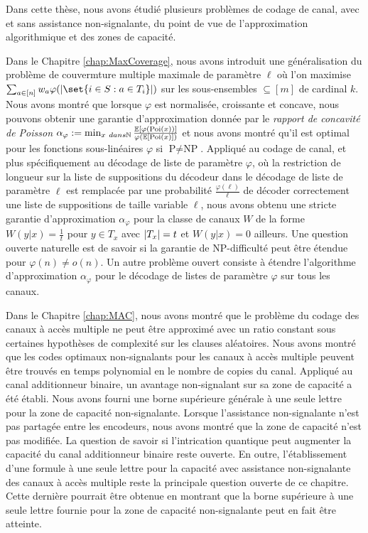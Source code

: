 Dans cette thèse, nous avons étudié plusieurs problèmes de codage de canal, avec et sans assistance non-signalante, du point de vue de l'approximation algorithmique et des zones de capacité.

Dans le Chapitre \ref{chap:MaxCoverage}, nous avons introduit une généralisation du problème de couvermture multiple maximale de paramètre $\ell$ où l'on maximise $\sum_{a \in [n]} w_a\varphi(\abs{\set{i \in S : a \in T_i}})$ sur les sous-ensembles $\subseteq [m]$ de cardinal $k$. Nous avons montré que lorsque $\varphi$ est normalisée, croissante et concave, nous pouvons obtenir une garantie d'approximation donnée par le \emph{rapport de concavité de Poisson} $\alpha_{\varphi} := \min_{x \ dans \mathbb{N}} \frac{\mathbb{E}[\varphi(\operatorname{\text{Poi}}(x))]}{\varphi(\mathbb{E}[\operatorname{\text{Poi}}(x)])}$ et nous avons montré qu'il est optimal pour les fonctions sous-linéaires $\varphi$ si $\textrm{P}\not=\textrm{NP}$. Appliqué au codage de canal, et plus spécifiquement au décodage de liste de paramètre $\varphi$, où la restriction de longueur sur la liste de suppositions du décodeur dans le décodage de liste de paramètre $\ell$ est remplacée par une probabilité $\frac{\varphi(\ell)}{\ell}$ de décoder correctement une liste de suppositions de taille variable $\ell$, nous avons obtenu une stricte garantie d'approximation $\alpha_{\varphi}$ pour la classe de canaux $W$ de la forme $W(y|x) = \frac{1}{t}$ pour $y \in T_x$ avec $\abs{T_x}=t$ et $W(y|x) = 0$ ailleurs. Une question ouverte naturelle est de savoir si la garantie de \textrm{NP}-difficulté peut être étendue pour $\varphi(n) \not= o(n)$. Un autre problème ouvert consiste à étendre l'algorithme d'approximation $\alpha_{\varphi}$ pour le décodage de listes de paramètre $\varphi$ sur tous les canaux.

Dans le Chapitre \ref{chap:MAC}, nous avons montré que le problème du codage des canaux à accès multiple ne peut être approximé avec un ratio constant sous certaines hypothèses de complexité sur les clauses aléatoires. Nous avons montré que les codes optimaux non-signalants pour les canaux à accès multiple peuvent être trouvés en temps polynomial en le nombre de copies du canal. Appliqué au canal additionneur binaire, un avantage non-signalant sur sa zone de capacité a été établi. Nous avons fourni une borne supérieure générale à une seule lettre pour la zone de capacité non-signalante. Lorsque l'assistance non-signalante n'est pas partagée entre les encodeurs, nous avons montré que la zone de capacité n'est pas modifiée. La question de savoir si l'intrication quantique peut augmenter la capacité du canal additionneur binaire reste ouverte. En outre, l'établissement d'une formule à une seule lettre pour la capacité avec assistance non-signalante des canaux à accès multiple reste la principale question ouverte de ce chapitre. Cette dernière pourrait être obtenue en montrant que la borne supérieure à une seule lettre fournie pour la zone de capacité non-signalante peut en fait être atteinte.

